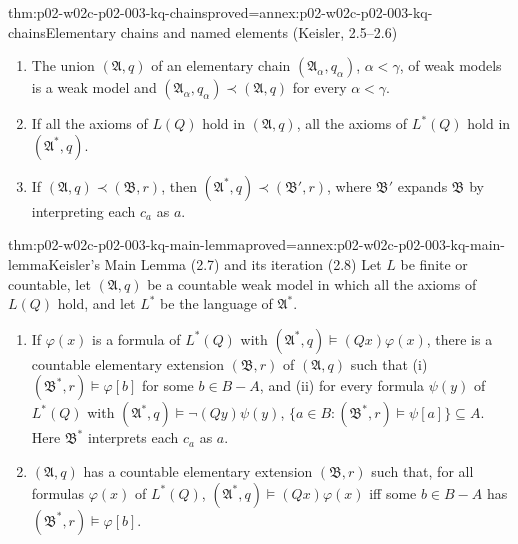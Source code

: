 \begin{hblemma}{thm:p02-w02c-p02-003-kq-chains}{proved=annex:p02-w02c-p02-003-kq-chains}{Elementary chains and named elements (Keisler, 2.5--2.6)}
\begin{enumerate}
\item The union \((\mathfrak A,q)\) of an elementary chain
      \((\mathfrak A_\alpha,q_\alpha)\), \(\alpha<\gamma\), of weak models is
      a weak model and \((\mathfrak A_\alpha,q_\alpha)\prec(\mathfrak A,q)\)
      for every \(\alpha<\gamma\).
\item If all the axioms of \(L(Q)\) hold in \((\mathfrak A,q)\), all the
      axioms of \(L^{*}(Q)\) hold in \((\mathfrak A^{*},q)\).
\item If \((\mathfrak A,q)\prec(\mathfrak B,r)\), then
      \((\mathfrak A^{*},q)\prec(\mathfrak B',r)\), where \(\mathfrak B'\)
      expands \(\mathfrak B\) by interpreting each \(c_a\) as \(a\).
\end{enumerate}
\end{hblemma}

\begin{hblemma}{thm:p02-w02c-p02-003-kq-main-lemma}{proved=annex:p02-w02c-p02-003-kq-main-lemma}{Keisler's Main Lemma (2.7) and its iteration (2.8)}
Let \(L\) be finite or countable, let \((\mathfrak A,q)\) be a countable
weak model in which all the axioms of \(L(Q)\) hold, and let \(L^{*}\) be
the language of \(\mathfrak A^{*}\).
\begin{enumerate}
\item If \(\varphi(x)\) is a formula of \(L^{*}(Q)\) with
      \((\mathfrak A^{*},q)\models(Qx)\varphi(x)\), there is a countable
      elementary extension \((\mathfrak B,r)\) of \((\mathfrak A,q)\) such
      that (i) \((\mathfrak B^{*},r)\models\varphi[b]\) for some
      \(b\in B-A\), and (ii) for every formula \(\psi(y)\) of \(L^{*}(Q)\)
      with \((\mathfrak A^{*},q)\models\neg(Qy)\psi(y)\),
      \(\{a\in B:(\mathfrak B^{*},r)\models\psi[a]\}\subseteq A\).
      Here \(\mathfrak B^{*}\) interprets each \(c_a\) as \(a\).
\item \((\mathfrak A,q)\) has a countable elementary extension
      \((\mathfrak B,r)\) such that, for all formulas \(\varphi(x)\) of
      \(L^{*}(Q)\), \((\mathfrak A^{*},q)\models(Qx)\varphi(x)\) iff some
      \(b\in B-A\) has \((\mathfrak B^{*},r)\models\varphi[b]\).
\end{enumerate}
\end{hblemma}

